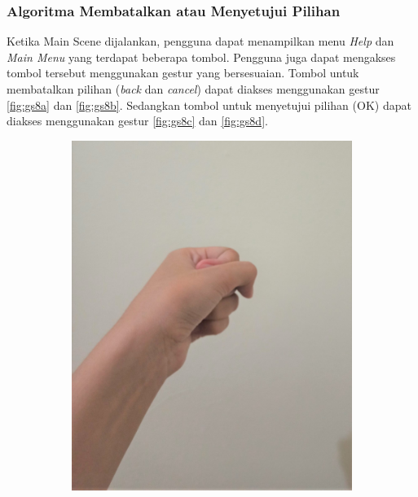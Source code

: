 \documentclass[conference]{IEEEtran}
\begin{document}
		\subsubsection{Algoritma Membatalkan atau Menyetujui Pilihan}
			Ketika Main Scene dijalankan, pengguna dapat menampilkan menu \textit{Help} dan \textit{Main Menu} yang terdapat beberapa tombol. Pengguna juga dapat mengakses tombol tersebut menggunakan gestur yang bersesuaian. Tombol untuk membatalkan pilihan (\textit{back} dan \textit{cancel}) dapat diakses menggunakan gestur \ref{fig:gs8a} dan \ref{fig:gs8b}. Sedangkan tombol untuk menyetujui pilihan (OK) dapat diakses menggunakan gestur \ref{fig:gs8c} dan \ref{fig:gs8d}.
				
		\begin{figure} [h]
			\begin{center}
			\begin{subfigure}[t]{0.11\textwidth}
				\includegraphics[width=\textwidth]{img/pola1a.jpg}
				\caption{\label{fig:gs1a}}
			\end{subfigure}
			\hspace{0.1em}

\end{center}
\end{figure}
\end{document}
